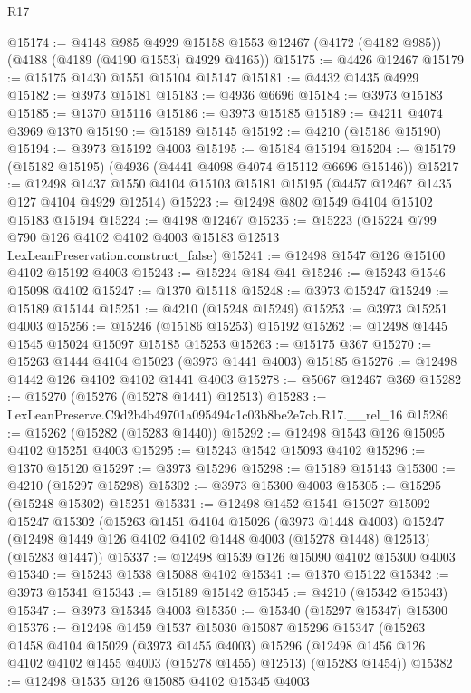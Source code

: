\begin{lexlean}{R17}
\begin{coremodule}
@15174 := @4148
    @985
    @4929
    @15158
    @1553
    @12467
    (@4172 (@4182 @985))
    (@4188 (@4189 (@4190 @1553) @4929 @4165))
@15175 := @4426 @12467
@15179 := @15175 @1430 @1551 @15104 @15147
@15181 := @4432 @1435 @4929
@15182 := @3973 @15181
@15183 := @4936 @6696
@15184 := @3973 @15183
@15185 := @1370 @15116
@15186 := @3973 @15185
@15189 := @4211 @4074 @3969 @1370
@15190 := @15189 @15145
@15192 := @4210 (@15186 @15190)
@15194 := @3973 @15192 @4003
@15195 := @15184 @15194
@15204 := @15179 (@15182 @15195) (@4936 (@4441 @4098 @4074 @15112 @6696 @15146))
@15217 := @12498 @1437 @1550 @4104 @15103 @15181 @15195 (@4457 @12467 @1435 @127 @4104 @4929 @12514)
@15223 := @12498 @802 @1549 @4104 @15102 @15183 @15194
@15224 := @4198 @12467
@15235 := @15223
    (@15224 @799 @790 @126 @4102 @4102 @4003 @15183 @12513 LexLeanPreservation.construct_false)
@15241 := @12498 @1547 @126 @15100 @4102 @15192 @4003
@15243 := @15224 @184 @41
@15246 := @15243 @1546 @15098 @4102
@15247 := @1370 @15118
@15248 := @3973 @15247
@15249 := @15189 @15144
@15251 := @4210 (@15248 @15249)
@15253 := @3973 @15251 @4003
@15256 := @15246 (@15186 @15253) @15192
@15262 := @12498 @1445 @1545 @15024 @15097 @15185 @15253
@15263 := @15175 @367
@15270 := @15263 @1444 @4104 @15023 (@3973 @1441 @4003) @15185
@15276 := @12498 @1442 @126 @4102 @4102 @1441 @4003
@15278 := @5067 @12467 @369
@15282 := @15270 (@15276 (@15278 @1441) @12513)
@15283 := LexLeanPreserve.C9d2b4b49701a095494c1c03b8be2e7cb.R17.__rel_16
@15286 := @15262 (@15282 (@15283 @1440))
@15292 := @12498 @1543 @126 @15095 @4102 @15251 @4003
@15295 := @15243 @1542 @15093 @4102
@15296 := @1370 @15120
@15297 := @3973 @15296
@15298 := @15189 @15143
@15300 := @4210 (@15297 @15298)
@15302 := @3973 @15300 @4003
@15305 := @15295 (@15248 @15302) @15251
@15331 := @12498
    @1452
    @1541
    @15027
    @15092
    @15247
    @15302
    (@15263
      @1451
      @4104
      @15026
      (@3973 @1448 @4003)
      @15247
      (@12498 @1449 @126 @4102 @4102 @1448 @4003 (@15278 @1448) @12513)
      (@15283 @1447))
@15337 := @12498 @1539 @126 @15090 @4102 @15300 @4003
@15340 := @15243 @1538 @15088 @4102
@15341 := @1370 @15122
@15342 := @3973 @15341
@15343 := @15189 @15142
@15345 := @4210 (@15342 @15343)
@15347 := @3973 @15345 @4003
@15350 := @15340 (@15297 @15347) @15300
@15376 := @12498
    @1459
    @1537
    @15030
    @15087
    @15296
    @15347
    (@15263
      @1458
      @4104
      @15029
      (@3973 @1455 @4003)
      @15296
      (@12498 @1456 @126 @4102 @4102 @1455 @4003 (@15278 @1455) @12513)
      (@15283 @1454))
@15382 := @12498 @1535 @126 @15085 @4102 @15345 @4003

\end{coremodule}
\end{lexlean}
